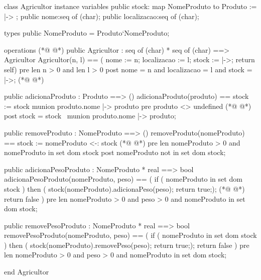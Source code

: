 \begin{vdmpp}[breaklines=true]
class Agricultor
instance variables
  public stock: map NomeProduto to Produto := { |-> };
  public nome:seq of (char);
  public localizacao:seq of (char);

types 
 public NomeProduto = Produto`NomeProduto;

operations
(*@
\label{Agricultor:11}
@*)
  public  Agricultor : seq of (char) * seq of (char) ==> Agricultor
   Agricultor(n, l) == ( nome := n; localizacao := l; stock := {|->}; return self)
  pre len n > 0 and len l > 0
  post nome = n and localizacao = l and stock = {|->};
(*@
\label{adicionaProduto:15}
@*)
 
  public  adicionaProduto : Produto ==> ()
   adicionaProduto(produto) == stock := stock munion {produto.nome |-> produto}
  pre produto <> undefined
(*@
\label{removeProduto:19}
@*)
  post  stock = stock~ munion {produto.nome |-> produto};

  public removeProduto : NomeProduto ==> ()
   removeProduto(nomeProduto) == stock := {nomeProduto} <-: stock
(*@
\label{adicionaPesoProduto:23}
@*)
  pre len nomeProduto > 0 and nomeProduto in set dom stock
  post nomeProduto not in set dom stock;
   
  public  adicionaPesoProduto : NomeProduto * real ==> bool
  adicionaPesoProduto(nomeProduto, peso) == 
   (
    if ( nomeProduto in set dom stock ) 
     then  ( stock(nomeProduto).adicionaPeso(peso); return true;);
(*@
\label{removePesoProduto:31}
@*)
    return false
   )
  pre len nomeProduto > 0 and peso > 0 and nomeProduto in set dom stock;
  
  public  removePesoProduto : NomeProduto * real ==> bool
  removePesoProduto(nomeProduto, peso) ==
    (
    if ( nomeProduto in set dom stock ) 
     then  ( stock(nomeProduto).removePeso(peso); return true;);
    return false
   )
  pre len nomeProduto > 0 and peso > 0 and nomeProduto in set dom stock;


end Agricultor
\end{vdmpp}
